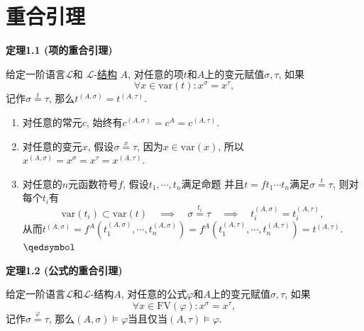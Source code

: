\documentclass[UTF8]{ctexart}
\begin{document}
\setlength{\abovedisplayskip}{1pt}
\setlength{\belowdisplayskip}{1pt}

\section{重合引理}

\hypertarget{sec:定理1.1}{}
\noindent\textbf{定理1.1 (项的重合引理)}

给定一阶语言$\mathcal{L}$和
$\mathcal{L}$-\href{../01 一阶语言的结构/01 一阶语言的结构#nameddest=sec:定义1.1}
{结构} $A$, 对任意的项$t$和$A$上的变元赋值$\sigma,\tau$, 如果
\[
    \forall x\in\mathrm{var}(t):x^\sigma=x^\tau,
\]
记作$\sigma\overset{\displaystyle t}{=}\tau$, 那么$t^{(A,\sigma)}=t^{(A,\tau)}$.


\begin{enumerate}
    \item 对任意的常元$c$, 始终有$c^{(A,\sigma)}=c^A=c^{(A,\tau)}$.
    \item 对任意的变元$x$, 假设$\sigma\overset{\displaystyle x}{=}\tau$,
    因为$x\in\mathrm{var}(x)$, 所以$x^{(A,\sigma)}=x^\sigma=x^\tau=x^{(A,\tau)}$.
    \item 对任意的$n$元函数符号$f$, 假设$t_1,\cdots,t_n$满足命题
    并且$t=ft_1\cdots t_n$满足$\sigma\overset{\displaystyle t}{=}\tau$,
    则对每个$t_i$有
    \vspace{3pt}
    \[
        \mathrm{var}(t_i)\subset\mathrm{var}(t)
        \quad\implies\quad\sigma\overset{\displaystyle t_i}{=}\tau
        \quad\implies\quad t_i^{(A,\sigma)}=t_i^{(A,\tau)},
    \]
    从而$t^{(A,\sigma)}=f^A(t_1^{(A,\sigma)},\cdots,t_n^{(A,\sigma)})
    =f^A(t_1^{(A,\tau)},\cdots,t_n^{(A,\tau)})=t^{(A,\tau)}$. \hfill $\qedsymbol$
\end{enumerate}

\vspace{10pt}

\hypertarget{sec:定理1.2}{}
\noindent\textbf{定理1.2 (公式的重合引理)}

给定一阶语言$\mathcal{L}$和$\mathcal{L}$-结构$A$,
对任意的公式$\varphi$和$A$上的变元赋值$\sigma,\tau$, 如果
\[
    \forall x\in\mathrm{FV}(\varphi):x^\sigma=x^\tau,
\]
记作$\sigma\overset{\displaystyle\varphi}{=}\tau$,
那么$(A,\sigma)\models\varphi$当且仅当$(A,\tau)\models\varphi$.

\end{document}
